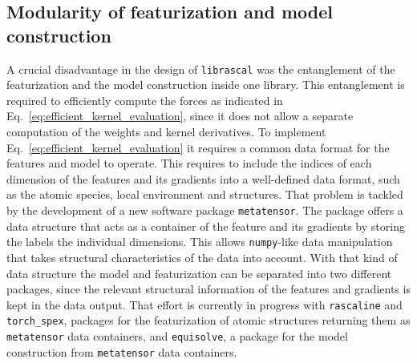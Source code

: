 \subsection{Modularity of featurization and model construction}
A crucial disadvantage in the design of \texttt{librascal} was the entanglement of the featurization and the model construction inside one library.
This entanglement is required to efficiently compute the forces as indicated in Eq.~\eqref{eq:efficient_kernel_evaluation}, since it does not allow a separate computation of the weights and kernel derivatives.
To implement Eq.~\eqref{eq:efficient_kernel_evaluation} it requires a common data format for the features and model to operate.
This requires to include the indices of each dimension of the features and its gradients into a well-defined data format, such as the atomic species, local environment and structures.
That problem is tackled by the development of a new software package \texttt{metatensor}.
The package offers a data structure that acts as a container of the feature and its gradients by storing the labels the individual dimensions.
This allows \texttt{numpy}-like data manipulation that takes structural characteristics of the data into account.
With that kind of data structure the model and featurization can be separated into two different packages, since the relevant structural information of the features and gradients is kept in the data output.
That effort is currently in progress with \texttt{rascaline} and \texttt{torch\_spex}, packages for the featurization of atomic structures returning them as \texttt{metatensor} data containers, and \texttt{equisolve}, a package for the model construction from \texttt{metatensor} data containers.


